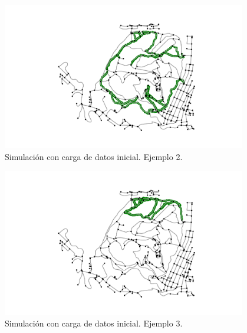 \begin{figure}[h]
\begin{center}
\includegraphics[width=0.95\textwidth]{./Imagenes/data-simulation/track2.png}
\caption{Simulación con carga de datos inicial. Ejemplo 2.}
\end{center}
\label{figure:Simulation2}
\end{figure}

\begin{figure}[h]
\begin{center}
\includegraphics[width=0.95\textwidth]{./Imagenes/data-simulation/track3.png}
\caption{Simulación con carga de datos inicial. Ejemplo 3.}
\end{center}
\label{figure:Simulation3}
\end{figure}

